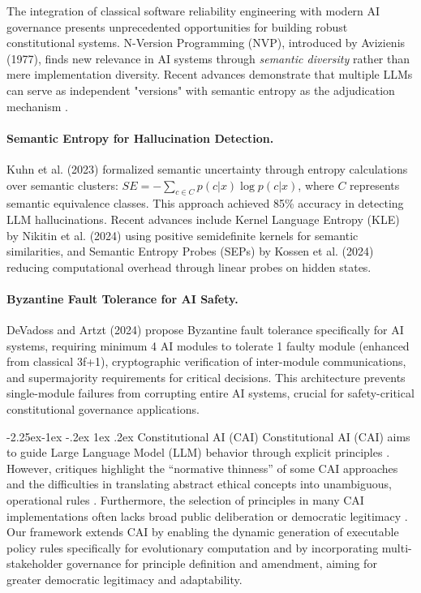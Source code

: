\documentclass[manuscript,screen,9pt]{acmart}
\makeatletter
\renewcommand\subsection{\@startsection{subsection}{2}{\z@}%
  {-2.25ex\@plus -1ex \@minus -.2ex}%
  {1ex \@plus .2ex}%
  {\normalfont\large\bfseries}}
\makeatother
\begin{document}
The integration of classical software reliability engineering with modern AI governance presents unprecedented opportunities for building robust constitutional systems. N-Version Programming (NVP), introduced by Avizienis (1977), finds new relevance in AI systems through \textit{semantic diversity} rather than mere implementation diversity. Recent advances demonstrate that multiple LLMs can serve as independent "versions" with semantic entropy as the adjudication mechanism \cite{Kuhn2023SemanticEntropy}.

\paragraph{Semantic Entropy for Hallucination Detection.} Kuhn et al. (2023) formalized semantic uncertainty through entropy calculations over semantic clusters: $SE = -\sum_{c \in C} p(c|x) \log p(c|x)$, where $C$ represents semantic equivalence classes. This approach achieved 85\% accuracy in detecting LLM hallucinations. Recent advances include Kernel Language Entropy (KLE) by Nikitin et al. (2024) using positive semidefinite kernels for semantic similarities, and Semantic Entropy Probes (SEPs) by Kossen et al. (2024) reducing computational overhead through linear probes on hidden states.

\paragraph{Byzantine Fault Tolerance for AI Safety.} DeVadoss and Artzt (2024) propose Byzantine fault tolerance specifically for AI systems, requiring minimum 4 AI modules to tolerate 1 faulty module (enhanced from classical 3f+1), cryptographic verification of inter-module communications, and supermajority requirements for critical decisions. This architecture prevents single-module failures from corrupting entire AI systems, crucial for safety-critical constitutional governance applications.

\subsection{Constitutional AI (CAI)}
Constitutional AI (CAI) aims to guide Large Language Model (LLM) behavior through explicit principles \cite{Bai2025ConstitutionalAI}. However, critiques highlight the ``normative thinness'' of some CAI approaches and the difficulties in translating abstract ethical concepts into unambiguous, operational rules \cite{DigiCon2025ConstitutionalAIThin, ChaconMenke2025CAISmallLLMs}. Furthermore, the selection of principles in many CAI implementations often lacks broad public deliberation or democratic legitimacy \cite{Hwang2025PublicCAI}. Our framework extends CAI by enabling the dynamic generation of executable policy rules specifically for evolutionary computation and by incorporating multi-stakeholder governance for principle definition and amendment, aiming for greater democratic legitimacy and adaptability.
\end{document}
